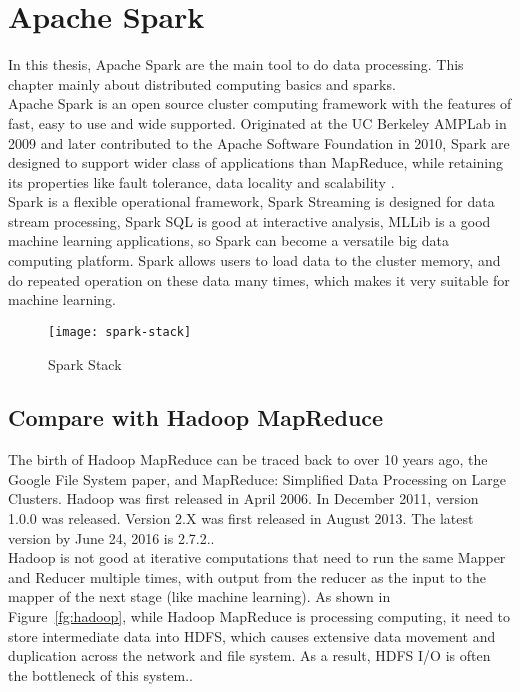 \chapter{Apache Spark}
\label{ch:spark}

In this thesis, Apache Spark are the main tool to do data processing. This chapter mainly about distributed computing basics and sparks.\\

Apache Spark is an open source cluster computing framework with the features of fast, easy to use and wide supported. Originated at the UC Berkeley AMPLab in 2009 and later contributed to the Apache Software Foundation in 2010, Spark are designed to support wider class of applications than MapReduce, while retaining its properties like fault tolerance, data locality and scalability \cite{ryza2015advanced}.\\


Spark is a flexible operational framework, Spark Streaming is designed for data stream processing, Spark SQL is good at interactive analysis, MLLib is a good machine learning applications, so Spark can become a versatile big data computing platform\cite{apache_spark}. Spark allows users to load data to the cluster memory, and do repeated operation on these data many times, which makes it very suitable for machine learning.
\begin{figure}[h]
	\centering
	\texttt{[image: spark-stack]}
	\caption{Spark Stack}
\end{figure}

\section{Compare with Hadoop MapReduce}

The birth of Hadoop MapReduce can be traced back to over 10 years ago, the Google File System paper\cite{ghemawat2003google}, and MapReduce: Simplified Data Processing on Large Clusters\cite{dean2008mapreduce}. Hadoop was first released in April 2006. In December 2011, version 1.0.0 was released. Version 2.X was first released in August 2013. The latest version by June 24, 2016 is 2.7.2.\cite{2_wadkarsiddalingaiah}.\\


Hadoop is not good at iterative computations that need to run the same Mapper and Reducer multiple times, with output from the reducer as the input to the mapper of the next stage (like machine learning). As shown in Figure~\ref{fg:hadoop}, while Hadoop MapReduce is processing computing, it need to store intermediate data into HDFS, which causes extensive data movement and duplication across the network and file system. As a result, HDFS I/O is often the bottleneck of this system.\cite{2_wadkarsiddalingaiah}.


